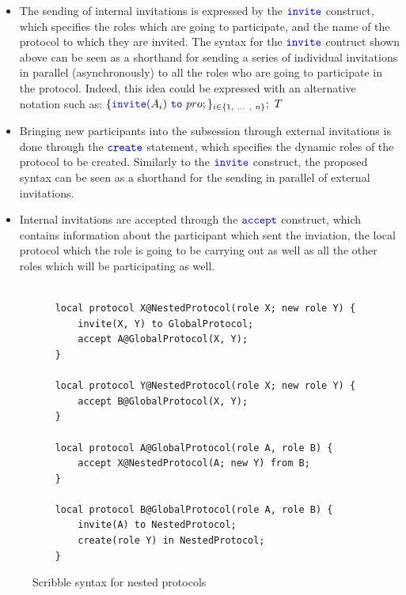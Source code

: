 \documentclass[12pt,twoside]{report}
\begin{document}
\begin{itemize}
    \item The sending of internal invitations is expressed by the ${\color{blue}\mathtt{invite}}$ construct, which specifies the roles which are going to participate, and the name of the protocol to which they are invited. The syntax for the ${\color{blue}\mathtt{invite}}$ contruct shown above can be seen as a shorthand for sending a series of individual invitations in parallel (asynchronously) to all the roles who are going to participate in the protocol. Indeed, this idea could be expressed with an alternative notation such as:
    $\{\invite(A_i)\ \scrto\ pro;\}_{i \in \{1,\ ...\ ,\ n\}};\ T$

    \item Bringing new participants into the subsession through external invitations is done through the ${\color{blue}\mathtt{create}}$ statement, which specifies the dynamic roles of the protocol to be created. Similarly to the ${\color{blue}\mathtt{invite}}$ construct, the proposed syntax can be seen as a shorthand for the sending in parallel of external invitations.
    
    \item Internal invitations are accepted through the ${\color{blue}\mathtt{accept}}$ construct, which contains information about the participant which sent the inviation, the local protocol which the role is going to be carrying out as well as all the other roles which will be participating as well.
\end{itemize}

\begin{figure}[htb!]
    \centering
    \lstset{language=Scribble}
    \begin{lstlisting}
    
    local protocol X@NestedProtocol(role X; new role Y) {
        invite(X, Y) to GlobalProtocol;
        accept A@GlobalProtocol(X, Y);
    }

    local protocol Y@NestedProtocol(role X; new role Y) {
        accept B@GlobalProtocol(X, Y);
    }
    
    local protocol A@GlobalProtocol(role A, role B) {
        accept X@NestedProtocol(A; new Y) from B;
    }

    local protocol B@GlobalProtocol(role A, role B) {
        invite(A) to NestedProtocol;
        create(role Y) in NestedProtocol;
    }
    \end{lstlisting}
    \caption{Scribble syntax for nested protocols}
    \label{scribble-nested-local}
\end{figure}{}
\end{document}
